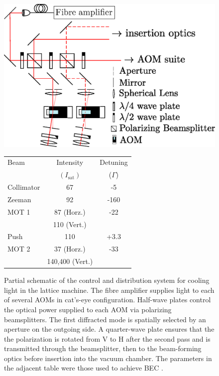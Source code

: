 	\begin{figure}
	    \begin{minipage}{0.45\textwidth}
	    \vspace{0pt}
			\caption{Partial schematic of the control and distribution system for cooling light in the lattice machine.
	The fibre amplifier supplies light to each of several AOMs in cat's-eye configuration.
	Half-wave plates control the optical power supplied to each AOM via polarizing beamsplitters.
	The first diffracted mode is spatially selected by an aperture on the outgoing side.
	A quarter-wave plate ensures that the the polarization is rotated from V to H after the second pass and is transmitted through the beamsplitter, then to the beam-forming optics before insertion into the vacuum chamber.
	The parameters in the adjacent table were those used to achieve BEC \cite{Abbas21}.}
	    \label{fig:distribution_optics}
		\end{minipage}
	    \hfill
	    \vspace{5pt}
		\begin{minipage}{0.5\textwidth}
			\vspace{0pt}
			\includegraphics[width=\textwidth]{fig/lattice/distribution_optics}
		  {\fontsize{11}{13}
		  \begin{tabular}{l c c}
		  \hline\hline
		  Beam & Intensity & Detuning \\
		   & $(I_\textrm{sat})$ & ($\Gamma$) \\
		  \hline
		  Collimator &67& -5\\
		  Zeeman &92&-160 \\
		  MOT 1 &87 (Horz.)&-22 \\
		  		&110 (Vert.) & \\
		  Push &110&+3.3 \\
		  MOT 2 &37 (Horz.)& -33\\
		   &140,400 (Vert.)& \\
		  \hline
		  \end{tabular}}
	    \end{minipage}
	\end{figure}

